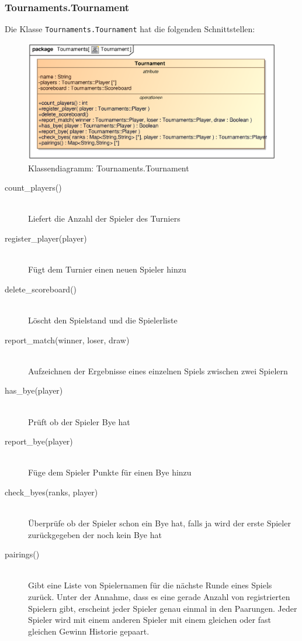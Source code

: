 \subsubsection{Tournaments.Tournament}
Die Klasse \verb|Tournaments.Tournament| hat die folgenden Schnittstellen:
\begin{figure}[H]
    \myfloatalign
    \includegraphics[width=\textwidth]{gfx/MtGDeepAnalysis/Tournament.eps}
    \caption{Klassendiagramm: Tournaments.Tournament}
    \label{fig:class:Tournaments.Tournament}
\end{figure}
\begin{description}
    \item[count\_players()] \hfill \\
    Liefert die Anzahl der Spieler des Turniers
    
    \item[register\_player(player)] \hfill \\
    Fügt dem Turnier einen neuen Spieler hinzu
    
    \item[delete\_scoreboard()] \hfill \\
    Löscht den Spielstand und die Spielerliste
    
    \item[report\_match(winner, loser, draw)] \hfill \\
    Aufzeichnen der Ergebnisse eines einzelnen Spiels zwischen zwei Spielern
    
    \item[has\_bye(player)] \hfill \\
    Prüft ob der Spieler Bye hat
    
    \item[report\_bye(player)] \hfill \\
    Füge dem Spieler Punkte für einen Bye hinzu
    
    \item[check\_byes(ranks, player)] \hfill \\
    Überprüfe ob der Spieler schon ein Bye hat, falls ja wird der erste Spieler zurückgegeben der noch kein Bye hat
    
    \item[pairings()] \hfill \\
    Gibt eine Liste von Spielernamen für die nächste Runde eines Spiels zurück. Unter der Annahme, dass es eine gerade Anzahl von registrierten Spielern gibt, erscheint jeder Spieler genau einmal in den Paarungen. Jeder Spieler wird mit einem anderen Spieler mit einem gleichen oder fast gleichen Gewinn Historie gepaart.
\end{description}

